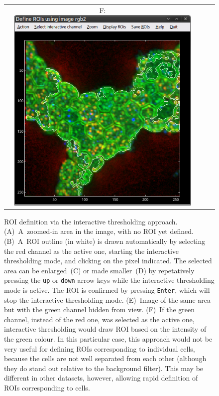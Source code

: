 \documentclass[a4paper, 11pt]{article}
\newcommand{\ttt}[1]{\texttt{#1}}
\begin{document}
\begin{figure}[!ht]
\begin{tabular}{ccccc}
&
F: \includegraphics[scale=0.23]{figs3/LANS-roi-interactive5}
\end{tabular}
\caption{\label{fig:roi-interactive5}%
ROI definition via the interactive thresholding approach. (A)~A~zoomed-in area in the image, with no ROI yet defined. (B)~A~ROI outline (in white) is drawn automatically by selecting the red channel as the active one, starting the interactive thresholding mode, and clicking on the pixel indicated. The selected area can be enlarged~(C) or made smaller~(D) by repetatively pressing the \ttt{up} or \ttt{down} arrow keys while the interactive thresholding mode is active. The ROI is confirmed by pressing \ttt{Enter}, which will stop the interactive thresholding mode. (E)~Image of the same area but with the green channel hidden from view. (F)~If the green channel, instead of the red one, was selected as the active one, interactive thresholding would draw ROI based on the intensity of the green colour. In this particular case, this approach would not be very useful for defining ROIs corresponding to individual cells, because the cells are not well separated from each other (although they do stand out relative to the background filter). This may be different in other datasets, however, allowing rapid definition of ROIs corresponding to cells.}
\end{figure}
\end{document}
